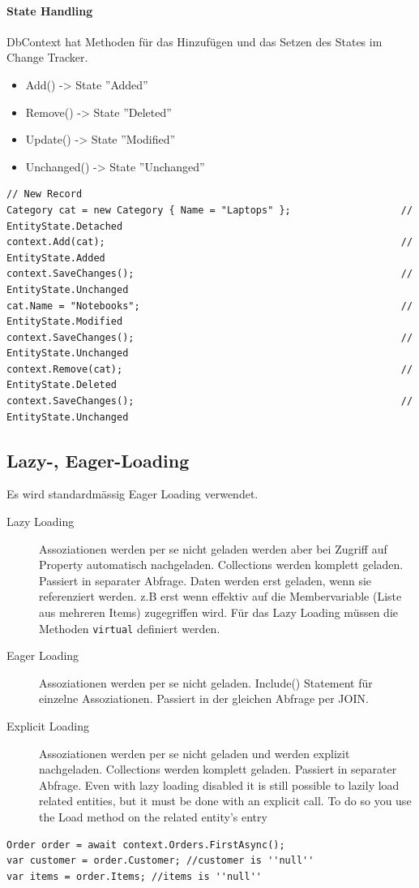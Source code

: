 \documentclass[
a4paper,
oneside,
10pt,
fleqn,
headsepline,
toc=listofnumbered, 
bibliography=totocnumbered]{scrartcl}
\begin{document}
\paragraph{State Handling} DbContext hat Methoden für das Hinzufügen und das Setzen des States im Change Tracker.
\begin{itemize}
	\item Add() -> State ''Added''
	\item Remove() -> State ''Deleted''
	\item Update() -> State ''Modified''
	\item Unchanged() -> State ''Unchanged''
\end{itemize}
\begin{lstlisting}
// New Record
Category cat = new Category { Name = "Laptops" };                   // EntityState.Detached
context.Add(cat);                                                   // EntityState.Added
context.SaveChanges();                                              // EntityState.Unchanged
cat.Name = "Notebooks";                                             // EntityState.Modified
context.SaveChanges();                                              // EntityState.Unchanged
context.Remove(cat);                                                // EntityState.Deleted
context.SaveChanges();                                              // EntityState.Unchanged
\end{lstlisting}

\subsection{Lazy-, Eager-Loading}
Es wird standardmässig Eager Loading verwendet.
\begin{description}
	\item[Lazy Loading] Assoziationen werden per se nicht geladen werden aber bei Zugriff auf Property automatisch nachgeladen. Collections werden komplett geladen. Passiert in separater Abfrage.
		Daten werden erst geladen, wenn sie referenziert werden. z.B erst wenn effektiv auf die Membervariable (Liste aus mehreren Items) zugegriffen wird. Für das Lazy Loading müssen die Methoden \lstinline|virtual| definiert werden.
	\item[Eager Loading] Assoziationen werden per se nicht geladen. Include() Statement für einzelne Assoziationen. Passiert in der gleichen Abfrage per JOIN.
	\item[Explicit Loading] Assoziationen werden per se nicht geladen und werden explizit nachgeladen. Collections werden komplett geladen. Passiert in separater Abfrage.
		Even with lazy loading disabled it is still possible to lazily load related entities, but it must be done with an explicit call. To do so you use the Load method on the related entity’s entry
\end{description}
\begin{lstlisting}
Order order = await context.Orders.FirstAsync();
var customer = order.Customer; //customer is ''null''
var items = order.Items; //items is ''null''
\end{lstlisting}
\end{document}
